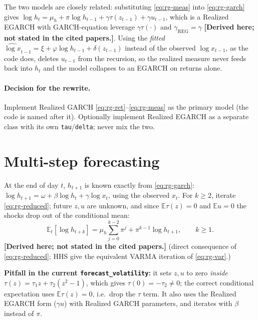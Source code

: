 \documentclass[11pt]{article}
\newcommand{\E}{\mathbb{E}}
\newcommand{\derived}{\textbf{[Derived here; not stated in the cited papers.]}}
\begin{document}
The two models are closely related: substituting \eqref{eq:rg-meas} into
\eqref{eq:rg-garch} gives $\log h_t=\mu_h+\pi\log h_{t-1}+\gamma\tau(z_{t-1})+\gamma u_{t-1}$,
which is a Realized EGARCH with GARCH-equation leverage $\gamma\tau(\cdot)$ and
$\gamma_{\text{REG}}=\gamma$ \derived. Using the \emph{fitted} $\widehat{\log x}_{t-1}=\xi+\varphi\log h_{t-1}+\delta(z_{t-1})$
instead of the observed $\log x_{t-1}$, as the code does, deletes $u_{t-1}$ from the recursion,
so the realized measure never feeds back into $h_t$ and the model collapses to an EGARCH
on returns alone.

\paragraph{Decision for the rewrite.} Implement Realized GARCH \eqref{eq:rg-ret}--\eqref{eq:rg-meas}
as the primary model (the code is named after it). Optionally implement Realized EGARCH as a
separate class with its own \texttt{tau}/\texttt{delta}; never mix the two.

\section{Multi-step forecasting}\label{sec:forecast}
At the end of day $t$, $h_{t+1}$ is known exactly from \eqref{eq:rg-garch}:
$\log h_{t+1}=\omega+\beta\log h_t+\gamma\log x_t$, using the observed $x_t$.
For $k\ge2$, iterate \eqref{eq:rg-reduced}; future $z,u$ are unknown, and since
$\E\tau(z)=0$ and $\E u=0$ the shocks drop out of the conditional mean:
\begin{equation}\label{eq:fc-logh}
\E_t[\log h_{t+k}] = \mu_h\sum_{j=0}^{k-2}\pi^j + \pi^{k-1}\log h_{t+1},\qquad k\ge1 .
\end{equation}
\derived{} (direct consequence of \eqref{eq:rg-reduced}; HHS give the equivalent VARMA
iteration of \eqref{eq:rg-var}.)

\textbf{Pitfall in the current \texttt{forecast\_volatility}:} it sets $z,u$ to zero
\emph{inside} $\tau(z)=\tau_1z+\tau_2(z^2-1)$, which gives $\tau(0)=-\tau_2\neq0$; the correct
conditional expectation uses $\E\tau(z)=0$, i.e.\ drop the $\tau$ term. It also uses the
Realized EGARCH form ($\gamma u$) with Realized GARCH parameters, and iterates with
$\beta$ instead of $\pi$.
\end{document}
